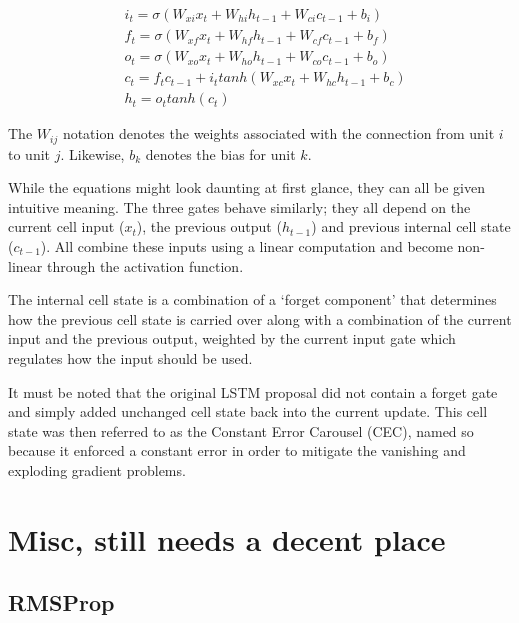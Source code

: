 \begin{align}
  &i_t = \sigma(W_{xi}x_t + W_{hi}h_{t-1}+W_{ci}c_{t-1} + b_i) \\
  &f_t = \sigma(W_{xf}x_t + W_{hf}h_{t-1}+W_{cf}c_{t-1} + b_f) \\
  &o_t = \sigma(W_{xo}x_t + W_{ho}h_{t-1}+W_{co}c_{t-1} + b_o) \\
  &c_t = f_tc_{t-1}+i_t tanh(W_{xc}x_t+W_{hc}h_{t-1}+b_c) \\
  &h_t = o_t tanh(c_t)
\end{align}

The $W_{ij}$ notation denotes the weights associated
with the connection from unit $i$ to unit $j$.
Likewise, $b_k$ denotes the bias for unit $k$.

While the equations might look daunting at first glance,
they can all be given intuitive meaning.
The three gates behave similarly;
they all depend on the current cell input ($x_t$),
the previous output ($h_{t-1}$)
and previous internal cell state ($c_{t-1}$).
All combine these inputs using a linear computation
and become non-linear through the activation function.

The internal cell state is a combination
of a `forget component' that determines
how the previous cell state is carried over
along with a combination of the current input and the previous output,
weighted by the current input gate
which regulates how the input should be used.

It must be noted that the original LSTM proposal
did not contain a forget gate
and simply added unchanged cell state
back into the current update.
This cell state was then referred to as the Constant Error Carousel (CEC),
named so because it enforced a constant error
in order to mitigate the vanishing and exploding gradient problems.



\section{Misc, still needs a decent place}
\subsection{RMSProp}
\label{sub:rmsprop}
